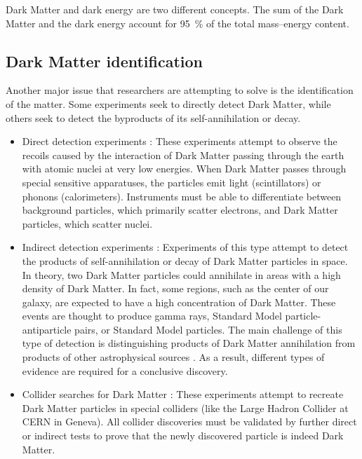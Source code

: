 Dark Matter and dark energy are two different concepts. The sum of the Dark Matter and the dark energy account for \SI{95}{\percent} of the total mass–energy content.


\subsection*{Dark Matter identification}
Another major issue that researchers are attempting to solve is the identification of the matter. Some experiments seek to directly detect Dark Matter, while others seek to detect the byproducts of its self-annihilation or decay.

\begin{itemize}
    \itemsep0em
    \item Direct detection experiments \cite{feng_2010_dark}: These experiments attempt to observe the recoils caused by the interaction of Dark Matter passing through the earth with atomic nuclei at very low energies. When Dark Matter passes through special sensitive apparatuses, the particles emit light (scintillators) or phonons (calorimeters). Instruments must be able to differentiate between background particles, which primarily scatter electrons, and Dark Matter particles, which scatter nuclei.
    \item Indirect detection experiments \cite{feng_2010_dark}: Experiments of this type attempt to detect the products of self-annihilation or decay of Dark Matter particles in space. In theory, two Dark Matter particles could annihilate in areas with a high density of Dark Matter. In fact, some regions, such as the center of our galaxy, are expected to have a high concentration of Dark Matter. These events are thought to produce gamma rays, Standard Model particle-antiparticle pairs, or Standard Model particles. The main challenge of this type of detection is distinguishing products of Dark Matter annihilation from products of other astrophysical sources \cite{doetinchem_2020_cosmicray}. As a result, different types of evidence are required for a conclusive discovery.
    \item Collider searches for Dark Matter \cite{feng_2010_dark}: These experiments attempt to recreate Dark Matter particles in special colliders (like the Large Hadron Collider at CERN in Geneva). All collider discoveries must be validated by further direct or indirect tests to prove that the newly discovered particle is indeed Dark Matter.
\end{itemize}

